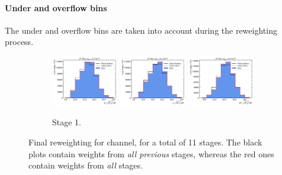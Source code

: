 \paragraph{Under and overflow bins}
The under and overflow bins are taken into account during
the reweighting process.


\begin{figure}[htb]
    \begin{subfigure}{\textwidth}
        \centering
        \includegraphics[width=0.32\textwidth]{./figs-mc-correction/reweighting-final/plot_step0-D0_iso-k_comp.pdf}
        \includegraphics[width=0.32\textwidth]{./figs-mc-correction/reweighting-final/plot_step0-D0_iso-pi_comp.pdf}
        \includegraphics[width=0.32\textwidth]{./figs-mc-correction/reweighting-final/plot_step0-D0_iso-d0_comp.pdf}
        \caption{Stage 1.}
    \end{subfigure}
    \caption{
        Final reweighting for \Dz channel, for a total of 11 stages.
        The black plots contain weights from \emph{all previous} stages,
        whereas the red ones contain weights from \emph{all} stages.
    }
    \label{fig:final-rwt-d0-idx0}
\end{figure}

